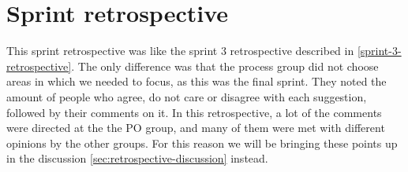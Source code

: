 \section{Sprint retrospective}\label{sec:sprint-4-retrospective}
This sprint retrospective was like the sprint 3 retrospective described in \autoref{sprint-3-retrospective}.
The only difference was that the process group did not choose areas in which we needed to focus, as this was the final sprint.
They noted the amount of people who agree, do not care or disagree with each suggestion, followed by their comments on it.
In this retrospective, a lot of the comments were directed at the the PO group, and many of them were met with different opinions by the other groups. 
For this reason we will be bringing these points up in the discussion \autoref{sec:retrospective-discussion} instead.
